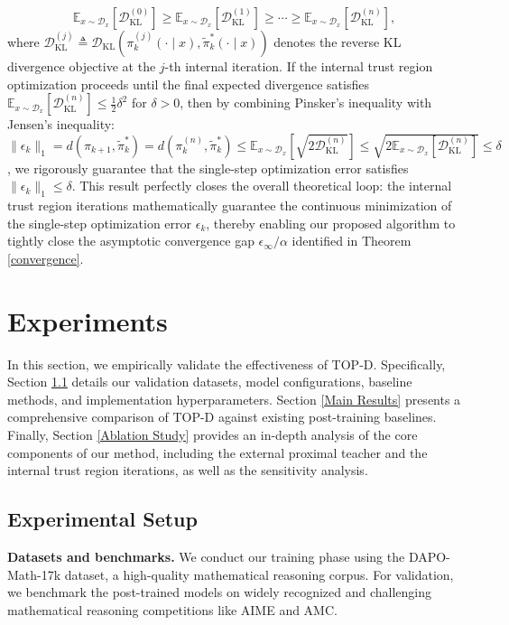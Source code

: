 \documentclass{article}
\theoremstyle{plain}
\theoremstyle{definition}
\theoremstyle{remark}
\begin{document}
\begin{equation}\label{decreasing sequence of KL divergences}
	\mathbb{E}_{x\sim\mathcal{D}_x}\left[\mathcal{D}_{\mathrm{KL}}^{(0)}\right]\geq\mathbb{E}_{x\sim\mathcal{D}_x}\left[\mathcal{D}_{\mathrm{KL}}^{(1)}\right]\geq\cdots\geq\mathbb{E}_{x\sim\mathcal{D}_x}\left[\mathcal{D}_{\mathrm{KL}}^{(n)}\right],
\end{equation}
where $\mathcal{D}_{\mathrm{KL}}^{(j)} \triangleq \mathcal{D}_{\mathrm{KL}}(\pi_k^{(j)}(\cdot \mid x),\tilde{\pi}_k^*(\cdot \mid x))$ denotes the reverse KL divergence objective at the $j$-th internal iteration. If the internal trust region optimization proceeds until the final expected divergence satisfies $\mathbb{E}_{x \sim \mathcal{D}_x}\left[\mathcal{D}_{\mathrm{KL}}^{(n)}\right] \leq \frac{1}{2}\delta^2$ for $\delta>0$, then by combining Pinsker's inequality with Jensen's inequality: $\lVert\epsilon_{k}\rVert_1=d(\pi_{k+1},\tilde{\pi}_k^*)=d(\pi_k^{(n)}, \tilde{\pi}_k^*)\leq\mathbb{E}_{x \sim \mathcal{D}_x}\left[\sqrt{2\mathcal{D}_{\mathrm{KL}}^{(n)}}\right]\leq\sqrt{2\mathbb{E}_{x\sim\mathcal{D}_x}\left[\mathcal{D}_{\mathrm{KL}}^{(n)}\right]}\leq\delta$, we rigorously guarantee that the single-step optimization error satisfies $\lVert\epsilon_k\rVert_1\leq\delta$. This result perfectly closes the overall theoretical loop: the internal trust region iterations mathematically guarantee the continuous minimization of the single-step optimization error $\epsilon_k$, thereby enabling our proposed algorithm to tightly close the asymptotic convergence gap $\epsilon_\infty/\alpha$ identified in Theorem \ref{convergence}.




\section{Experiments}
In this section, we empirically validate the effectiveness of TOP-D. Specifically, Section \ref{Experimental Setup} details our validation datasets, model configurations, baseline methods, and implementation hyperparameters. Section \ref{Main Results} presents a comprehensive comparison of TOP-D against existing post-training baselines. Finally, Section \ref{Ablation Study} provides an in-depth analysis of the core components of our method, including the external proximal teacher and the internal trust region iterations, as well as the sensitivity analysis.

\subsection{Experimental Setup}\label{Experimental Setup}
\textbf{Datasets and benchmarks.} We conduct our training phase using the DAPO-Math-17k \citep{yu2025dapo} dataset, a high-quality mathematical reasoning corpus. For validation, we benchmark the post-trained models on widely recognized and challenging mathematical reasoning competitions like AIME and AMC.
\end{document}
